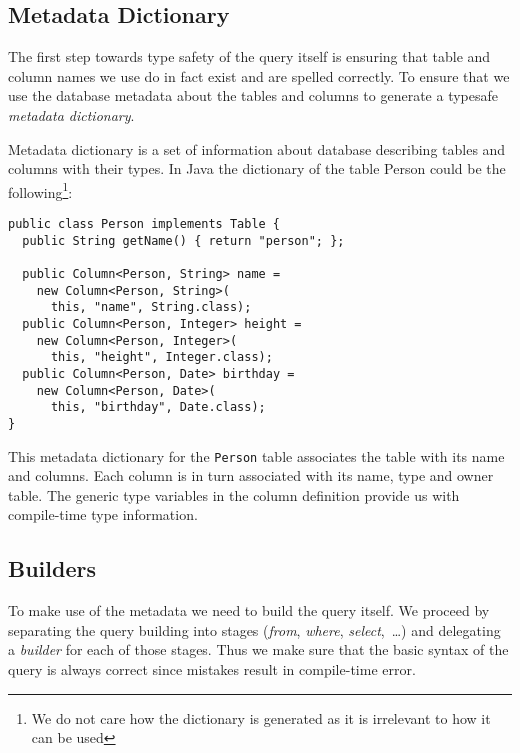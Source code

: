 \documentclass{sig-alternate}
\begin{document}
\subsection{Metadata Dictionary}

The first step towards type safety of the query itself is ensuring that table and column names we use do in fact exist and are spelled correctly. To ensure that we use the database metadata about the tables and columns to generate a typesafe \emph{metadata dictionary}.

Metadata dictionary is a set of information about database describing tables and columns with their types. In Java the dictionary of the table Person could be the following\footnote{We do not care how the dictionary is generated as it is irrelevant to how it can be used}:

\begin{verbatim}
public class Person implements Table {
  public String getName() { return "person"; };

  public Column<Person, String> name = 
    new Column<Person, String>(
      this, "name", String.class);
  public Column<Person, Integer> height = 
    new Column<Person, Integer>(
      this, "height", Integer.class);
  public Column<Person, Date> birthday = 
    new Column<Person, Date>(
      this, "birthday", Date.class);
}
\end{verbatim}

This metadata dictionary for the \verb!Person! table associates the table with
its name and columns. Each column is in turn associated with its name, type and
owner table. The generic type variables in the column definition provide us
with compile-time type information.

\subsection{Builders}

To make use of the metadata we need to build the query itself. We proceed by separating the query building into stages (\emph{from}, \emph{where}, \emph{select},~\ldots) and delegating a \emph{builder} for each of those stages. Thus we make sure that the basic syntax of the query is always correct since mistakes result in compile-time error.
\end{document}
